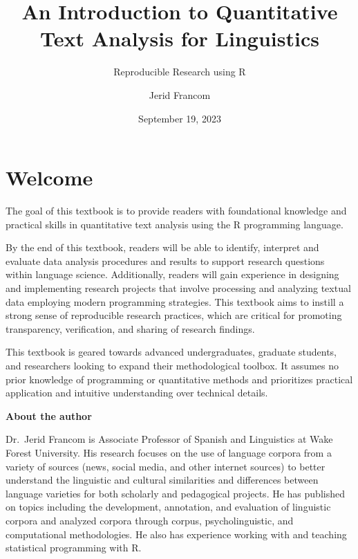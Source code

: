 \documentclass[
  letterpaper,
  DIV=11,
  numbers=noendperiod]{scrreport}
\title{An Introduction to Quantitative Text Analysis for Linguistics}
\subtitle{Reproducible Research using R}
\author{Jerid Francom}
\date{September 19, 2023}
\renewcommand*\contentsname{Table of contents}
\newcommand\contentsname{Table of contents}
\theoremstyle{definition}
\theoremstyle{remark}
\begin{document}
\maketitle
\ifdefined\Shaded\renewenvironment{Shaded}{\begin{tcolorbox}[breakable, frame hidden, colback={codebgcolor}, borderline west={3pt}{0pt}{shadecolor}, sharp corners, boxrule=0pt, enhanced]}{\end{tcolorbox}}\fi

\renewcommand*\contentsname{Table of contents}
{
\setcounter{tocdepth}{2}
\tableofcontents
}

\hypertarget{welcome}{%
\chapter*{Welcome}\label{welcome}}


The goal of this textbook is to provide readers with foundational
knowledge and practical skills in quantitative text analysis using the R
programming language.

By the end of this textbook, readers will be able to identify, interpret
and evaluate data analysis procedures and results to support research
questions within language science. Additionally, readers will gain
experience in designing and implementing research projects that involve
processing and analyzing textual data employing modern programming
strategies. This textbook aims to instill a strong sense of reproducible
research practices, which are critical for promoting transparency,
verification, and sharing of research findings.

This textbook is geared towards advanced undergraduates, graduate
students, and researchers looking to expand their methodological
toolbox. It assumes no prior knowledge of programming or quantitative
methods and prioritizes practical application and intuitive
understanding over technical details.

\textbf{About the author}

Dr.~Jerid Francom is Associate Professor of Spanish and Linguistics at
Wake Forest University. His research focuses on the use of language
corpora from a variety of sources (news, social media, and other
internet sources) to better understand the linguistic and cultural
similarities and differences between language varieties for both
scholarly and pedagogical projects. He has published on topics including
the development, annotation, and evaluation of linguistic corpora and
analyzed corpora through corpus, psycholinguistic, and computational
methodologies. He also has experience working with and teaching
statistical programming with R.
\end{document}
